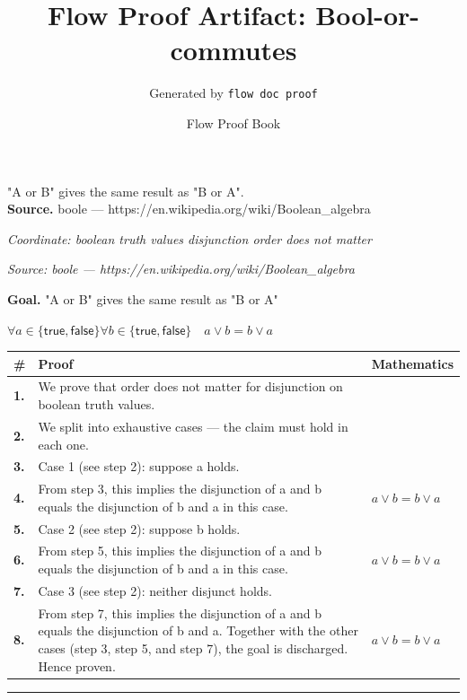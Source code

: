 \documentclass[11pt]{article}
\title{Flow Proof Artifact: Bool-or-commutes}
\author{Generated by \texttt{flow doc proof}}
\date{Flow Proof Book}
\theoremstyle{definition}
\begin{document}
\maketitle
"A or B" gives the same result as "B or A".\\[0.5em]
\textbf{Source.} boole — https://en.wikipedia.org/wiki/Boolean\_algebra\\[0.5em]
\bigskip
{}\par
\smallskip\noindent\textit{Coordinate: boolean truth values \cdot disjunction \cdot order does not matter}\par
\smallskip\noindent\textit{Source: boole — https://en.wikipedia.org/wiki/Boolean\_algebra}\par
\medskip
\noindent\textbf{Goal.} "A or B" gives the same result as "B or A"\par
\noindent$\displaystyle \forall a \in \{\mathsf{true}, \mathsf{false}\} \forall b \in \{\mathsf{true}, \mathsf{false}\}\quad a \lor b = b \lor a$\par
\medskip
\noindent
\begin{tabular}{@{} >{\raggedright\arraybackslash}p{} >{\raggedright\arraybackslash}p{} >{\raggedleft\arraybackslash}p{} @{}}
\textbf{\#} & \textbf{Proof} & \textbf{Mathematics} \\
\midrule
\textbf{1.} & We prove that order does not matter for disjunction on boolean truth values. & \\[0.45em]
\textbf{2.} & We split into exhaustive cases — the claim must hold in each one. & \\[0.45em]
\textbf{3.} & Case 1 (see step 2): suppose a holds. & \\[0.45em]
\textbf{4.} & From step 3, this implies the disjunction of a and b equals the disjunction of b and a in this case. & $\displaystyle a \lor b = b \lor a$ \\[0.45em]
\textbf{5.} & Case 2 (see step 2): suppose b holds. & \\[0.45em]
\textbf{6.} & From step 5, this implies the disjunction of a and b equals the disjunction of b and a in this case. & $\displaystyle a \lor b = b \lor a$ \\[0.45em]
\textbf{7.} & Case 3 (see step 2): neither disjunct holds. & \\[0.45em]
\textbf{8.} & From step 7, this implies the disjunction of a and b equals the disjunction of b and a. Together with the other cases (step 3, step 5, and step 7), the goal is discharged. Hence proven. & $\displaystyle a \lor b = b \lor a$ \\[0.45em]
\bottomrule
\end{tabular}
\label{thm:Bool-disjunction-order_does_not_matter}
\par\medskip\hrule
\end{document}
